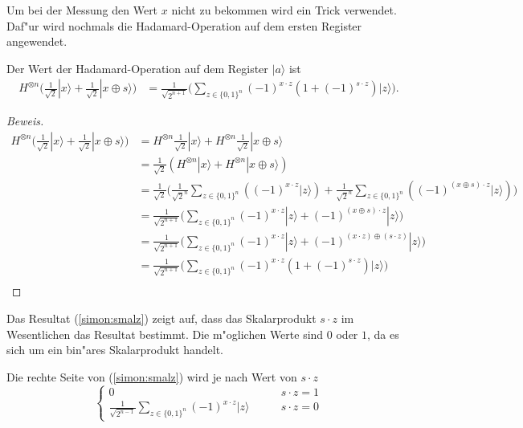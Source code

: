 \begin{refsection}
Um bei der Messung den Wert $x$ nicht zu bekommen wird ein Trick verwendet.
Daf"ur wird nochmals die Hadamard-Operation auf dem ersten Register angewendet.
\begin{hilfssatz}
  Der Wert der Hadamard-Operation auf dem Register $|a\rangle$ ist
  \begin{align}
    H^{ \otimes n } \biggl( 
                     \frac{1}{\sqrt{2}} |x\rangle + 
                     \frac{1}{\sqrt{2}} |x \oplus s\rangle 
                     \biggr)
    &= \frac1{\sqrt{2^{n + 1}}}
       \biggl( 
          \sum_{z \in \{0,1\}^n}  { (-1)^{x \cdot z} ( 1 + (-1)^{ s \cdot z}) |z\rangle } 
       \biggr).
  \label{simon:smalz}
\end{align}
\end{hilfssatz}

\begin{proof}[Beweis]
\begin{align*}
    H^{ \otimes n } \biggl( 
                     \frac{1}{\sqrt{2}} |x\rangle + 
                     \frac{1}{\sqrt{2}} |x \oplus s\rangle 
                     \biggr)
    &= H^{ \otimes n } \frac{1}{\sqrt{2}} |x\rangle + 
       H^{ \otimes n } \frac{1}{\sqrt{2}} |x \oplus s\rangle 
    \\ 
    &= \frac1{\sqrt{2}} ( H^{ \otimes n } |x\rangle + H^{ \otimes n } |x \oplus s\rangle )
    \\
    &= \frac1{\sqrt{2}}
       \biggl( \frac1{\sqrt{2}^n} \sum_{z \in \{0,1\}^n} {( (-1)^{x \cdot z} |z\rangle )} + 
               \frac1{\sqrt{2}^n}  \sum_{z \in \{0,1\}^n} { ( (-1)^{(x \oplus s) \cdot z } |z\rangle)}
       \biggr)
    \\
    &= \frac1{\sqrt{2^{n + 1}}}
       \biggl( \sum_{z \in \{0,1\}^n}  { 
                   (-1)^{x \cdot z} |z\rangle + (-1)^{(x \oplus s) \cdot z } |z\rangle 
               } 
       \biggr)
    \\
    &= \frac1{\sqrt{2^{n + 1}}}
       \biggl( \sum_{z \in \{0,1\}^n}  { 
                  (-1)^{x \cdot z} |z\rangle + (-1)^{(x \cdot z) \oplus ( s \cdot z) } |z\rangle 
               } 
       \biggr)
    \\
    &= \frac1{\sqrt{2^{n + 1}}}
       \biggl( 
          \sum_{z \in \{0,1\}^n}  { (-1)^{x \cdot z} ( 1 + (-1)^{ s \cdot z}) |z\rangle } 
       \biggr)
    \\
\end{align*}
\end{proof}

Das Resultat (\ref{simon:smalz}) zeigt auf, dass das Skalarprodukt $s \cdot z$ im Wesentlichen das
Resultat bestimmt. Die m"oglichen Werte sind $0$ oder $1$, da es sich um ein
bin"ares Skalarprodukt handelt.
\begin{hilfssatz}
  Die rechte Seite von (\ref{simon:smalz}) wird je nach Wert von $s \cdot z$
  \[
    \begin{cases}
      0 & \qquad s \cdot z = 1 \\
     \displaystyle \frac1{\sqrt{2^{n - 1}}} \sum_{z \in \{0,1\}^n}  { (-1)^{x \cdot
     z}|z\rangle } & \qquad s \cdot z = 0
    \end{cases}
  \]
\end{hilfssatz}


\end{refsection}
